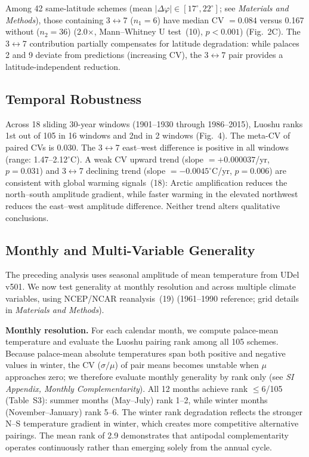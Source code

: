 \documentclass[9pt,twocolumn]{article}
\begin{document}
Among 42 same-latitude schemes (mean $|\Delta\varphi| \in [17^\circ, 22^\circ]$; see \textit{Materials and Methods}), those containing 3$\leftrightarrow$7 ($n_1 = 6$) have median CV $= 0.084$ versus 0.167 without ($n_2 = 36$) (2.0$\times$, Mann--Whitney U test~(10), $p < 0.001$) (Fig.~2C). The 3$\leftrightarrow$7 contribution partially compensates for latitude degradation: while palaces 2 and 9 deviate from predictions (increasing CV), the 3$\leftrightarrow$7 pair provides a latitude-independent reduction.

\subsection*{Temporal Robustness}

Across 18 sliding 30-year windows (1901--1930 through 1986--2015), Luoshu ranks 1st out of 105 in 16 windows and 2nd in 2 windows (Fig.~4). The meta-CV of paired CVs is 0.030. The 3$\leftrightarrow$7 east--west difference is positive in all windows (range: 1.47--2.12$^\circ$C). A weak CV upward trend (slope $= +0.000037$/yr, $p = 0.031$) and 3$\leftrightarrow$7 declining trend (slope $= -0.0045^\circ$C/yr, $p = 0.006$) are consistent with global warming signals~(18): Arctic amplification reduces the north--south amplitude gradient, while faster warming in the elevated northwest reduces the east--west amplitude difference. Neither trend alters qualitative conclusions.

\subsection*{Monthly and Multi-Variable Generality}

The preceding analysis uses seasonal amplitude of mean temperature from UDel v501. We now test generality at monthly resolution and across multiple climate variables, using NCEP/NCAR reanalysis~(19) (1961--1990 reference; grid details in \textit{Materials and Methods}).

\textbf{Monthly resolution.} For each calendar month, we compute palace-mean temperature and evaluate the Luoshu pairing rank among all 105 schemes. Because palace-mean absolute temperatures span both positive and negative values in winter, the CV ($\sigma/\mu$) of pair means becomes unstable when $\mu$ approaches zero; we therefore evaluate monthly generality by rank only (see \textit{SI Appendix, Monthly Complementarity}). All 12 months achieve rank $\leq$6/105 (Table~S3): summer months (May--July) rank 1--2, while winter months (November--January) rank 5--6. The winter rank degradation reflects the stronger N--S temperature gradient in winter, which creates more competitive alternative pairings. The mean rank of 2.9 demonstrates that antipodal complementarity operates continuously rather than emerging solely from the annual cycle.
\end{document}
